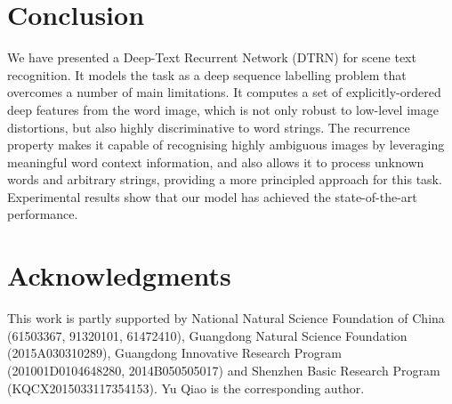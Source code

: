 \documentclass[letterpaper]{article}
\begin{document}
\section{Conclusion}

We have presented a Deep-Text Recurrent Network (DTRN) for scene text recognition.  It models the task as a deep sequence labelling problem that overcomes a number of main limitations. It computes a set of explicitly-ordered deep features from the word image, which is not only robust to low-level image distortions, but also highly discriminative to word strings. The recurrence property makes it capable of recognising highly ambiguous images by leveraging meaningful word context information, and also allows it to process unknown words and arbitrary strings, providing a more principled approach for this task. Experimental results show that our model has achieved the state-of-the-art performance.



\section{ Acknowledgments}
This work is partly supported by National Natural Science Foundation of China (61503367, 91320101, 61472410), Guangdong Natural Science Foundation (2015A030310289), Guangdong Innovative Research Program (201001D0104648280, 2014B050505017) and Shenzhen Basic Research Program (KQCX2015033117354153). Yu Qiao is the corresponding author.

{


}
\end{document}
